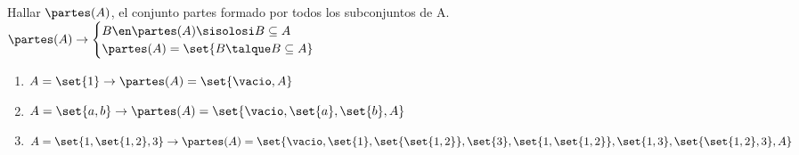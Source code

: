 \ejercicio
Hallar $\partes(A)$, el conjunto partes formado por todos los subconjuntos de A.\\
$
	\partes(A) \to
	\begin{cases}
		B \en \partes(A) \sisolosi B \subseteq A \\
		\partes(A) = \set{B \talque B \subseteq A}
	\end{cases}
$
\begin{enumerate}[label=(\roman*)]
	\item $A = \set{1} \to \partes(A) = \set{\vacio, A}$ 
	\item $A = \set{a, b} \to \partes(A) = \set{\vacio, \set{a}, \set{b}, A}$
	\item $A = \set{1, \set{1,2}, 3} \to \partes(A) = \set{\vacio, \set{1},\set{\set{1,2}}, \set{3}, \set{1,\set{1,2}}, \set{1,3},\set{\set{1,2},3}, A }$
\end{enumerate}
